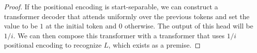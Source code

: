 \startseparable*

\begin{proof}
If the positional encoding is start-separable, we can construct a transformer decoder that attends uniformly over the previous tokens and set the value to be $1$ at the initial token and $0$ otherwise. The output of this head will be $1/i$. We can then compose this transformer with a transformer that uses $1/i$ positional encoding to recognize $L$, which exists as a premise.
\end{proof}